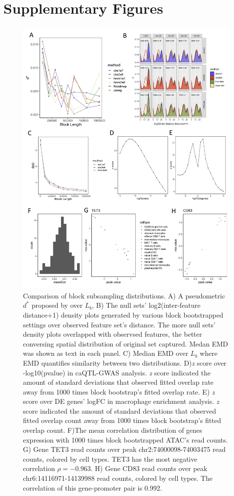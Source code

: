 \documentclass{article}
\begin{document}
\section{Supplementary Figures}
\begin{figure}[t]
\centering
\includegraphics[scale=0.8]{Figures/sfig.jpg}
\caption{Comparison of block subsampling distributions. A) A pseudometric $d^*$ proposed by \citet{bickel2010subsampling} over $L_b$, B) The null sets' log2(inter-feature distance+1) density plots generated by various block bootstrapped settings over observed feature set's distance. The more null sets' density plots overlapped with observsed features, the better conversing spatial distribution of original set captured. Medan EMD was shown as text in each panel. C) Median EMD over $L_b$ where EMD quantifies similarity between two distributions. D)\textit{z} score over -log10(pvalue) in caQTL-GWAS analysis. \textit{z} score indicated the amount of standard deviations that observed fitted overlap rate away from 1000 times block bootstrap's fitted overlap rate. E) \textit{z} score over DE genes' logFC in macrophage enrichment analysis. \textit{z} score indicated the amount of standard deviations that observed fitted overlap count away from 1000 times block bootstrap's fitted overlap count. F)The mean correlation distribution of genes expression with 1000 times block bootstrapped ATAC's read counts. G) Gene TET3 read counts over peak chr2:74000098-74003475 read counts, colored by cell types. TET3 has the most negative correlation $\rho = −0.963$. H) Gene CD83 read counts over peak chr6:14116971-14139988 read counts, colored by cell types. The correlation of this gene-promoter pair is 0.992.} 
\label{fig:suppfig}
\end{figure}


%
%
%
%
%
%
%

\end{document}
